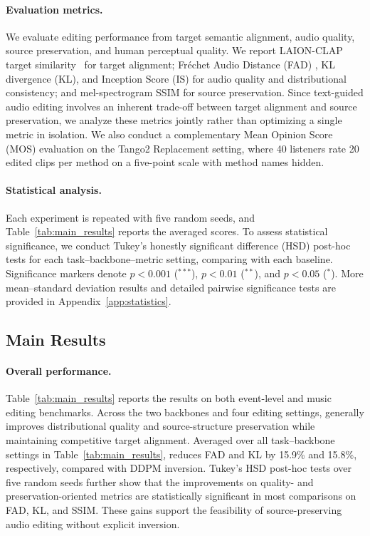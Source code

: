 \paragraph{Evaluation metrics.}
We evaluate editing performance from target semantic alignment, audio quality, source preservation, and human perceptual quality.
We report LAION-CLAP target similarity~\citep{laionclap} for target alignment; Fr\'echet Audio Distance (FAD) \cite{DBLP:conf/interspeech/KilgourZRS19}, KL divergence (KL), and Inception Score (IS) \cite{DBLP:conf/nips/SalimansGZCRCC16} for audio quality and distributional consistency; and mel-spectrogram SSIM \cite{wang2004image} for source preservation.
Since text-guided audio editing involves an inherent trade-off between target alignment and source preservation, we analyze these metrics jointly rather than optimizing a single metric in isolation.
We also conduct a complementary Mean Opinion Score (MOS) evaluation on the Tango2 Replacement setting, where 40 listeners rate 20 edited clips per method on a five-point scale with method names hidden.

\paragraph{Statistical analysis.}
Each experiment is repeated with five random seeds, and Table~\ref{tab:main_results} reports the averaged scores.
To assess statistical significance, we conduct Tukey's honestly significant difference (HSD) post-hoc tests \cite{tukey1949comparing} for each task--backbone--metric setting, comparing \ourmethod{} with each baseline.
Significance markers denote $p<0.001$ ($^{***}$), $p<0.01$ ($^{**}$), and $p<0.05$ ($^{*}$).
More mean--standard deviation results and detailed pairwise significance tests are provided in Appendix~\ref{app:statistics}.

\subsection{Main Results}

\paragraph{Overall performance.}
Table~\ref{tab:main_results} reports the results on both event-level and music editing benchmarks.
Across the two backbones and four editing settings, \ourmethod{} generally improves distributional quality and source-structure preservation while maintaining competitive target alignment.
Averaged over all task--backbone settings in Table~\ref{tab:main_results}, \ourmethod{} reduces FAD and KL by 15.9\% and 15.8\%, respectively, compared with DDPM inversion.
Tukey's HSD post-hoc tests over five random seeds further show that the improvements on quality- and preservation-oriented metrics are statistically significant in most comparisons on FAD, KL, and SSIM.
These gains support the feasibility of source-preserving audio editing without explicit inversion.

